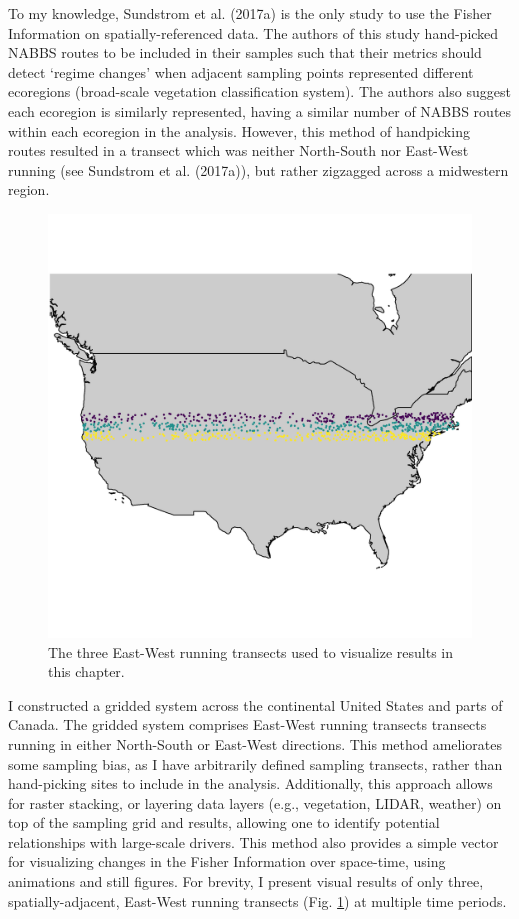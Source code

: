 \documentclass[12pt,twoside,openany]{reedthesis}
\begin{document}
To my knowledge, Sundstrom et al. (2017a) is the only study to use the
Fisher Information on spatially-referenced data. The authors of this
study hand-picked NABBS routes to be included in their samples such that
their metrics should detect `regime changes' when adjacent sampling
points represented different ecoregions (broad-scale vegetation
classification system). The authors also suggest each ecoregion is
similarly represented, having a similar number of NABBS routes within
each ecoregion in the analysis. However, this method of handpicking
routes resulted in a transect which was neither North-South nor
East-West running (see Sundstrom et al. (2017a)), but rather zigzagged
across a midwestern region.
\begin{figure}
\includegraphics[width=0.85\linewidth]{./chapterFiles/fisherSpatial/figures/figsCalledInDiss/transectSamplingALlRoutesUsed} \caption{The three East-West running transects used to visualize results in this chapter.}\label{fig:ewRoutesUsedHere}
\end{figure}
I constructed a gridded system across the continental United States and
parts of Canada. The gridded system comprises East-West running
transects transects running in either North-South or East-West
directions. This method ameliorates some sampling bias, as I have
arbitrarily defined sampling transects, rather than hand-picking sites
to include in the analysis. Additionally, this approach allows for
raster stacking, or layering data layers (e.g., vegetation, LIDAR,
weather) on top of the sampling grid and results, allowing one to
identify potential relationships with large-scale drivers. This method
also provides a simple vector for visualizing changes in the Fisher
Information over space-time, using animations and still figures. For
brevity, I present visual results of only three, spatially-adjacent,
East-West running transects (Fig. \ref{fig:ewRoutesUsedHere}) at
multiple time periods.
\end{document}
